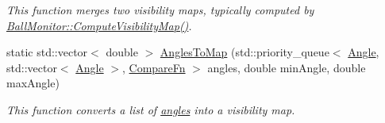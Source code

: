 \begin{DoxyCompactItemize}
\begin{DoxyCompactList}\small\item\em This function merges two visibility maps, typically computed by \hyperlink{classBallMonitor_a0d2ef73ba2b0573021c800c311e08245}{BallMonitor::ComputeVisibilityMap()}. \item\end{DoxyCompactList}\item 
static std::vector$<$ double $>$ \hyperlink{classBallMonitor_acb5d7a14b07253e7db6b629878b25077}{AnglesToMap} (std::priority\_\-queue$<$ \hyperlink{structBallMonitor_1_1Angle}{Angle}, std::vector$<$ \hyperlink{structBallMonitor_1_1Angle}{Angle} $>$, \hyperlink{classBallMonitor_a5ad781c99d5b43bee7c838de9da75527}{CompareFn} $>$ angles, double minAngle, double maxAngle)
\begin{DoxyCompactList}\small\item\em This function converts a list of \hyperlink{structBallMonitor_1_1Angle}{angles} into a visibility map. \item\end{DoxyCompactList}\end{DoxyCompactItemize}
